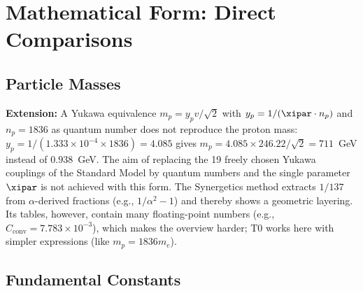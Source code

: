 	\section{Mathematical Form: Direct Comparisons}
	
	\subsection{Particle Masses}
	
	\begin{center}
	\end{center}
	
	
	
	\textbf{Extension:} A Yukawa equivalence $m_p = y_p v / \sqrt{2}$ with $y_p = 1 / (\xipar \cdot n_p)$ and $n_p = 1836$ as quantum number does not reproduce the proton mass: $y_p = 1/(1.333\times10^{-4}\times1836) = 4.085$ gives $m_p = 4.085\times246.22/\sqrt2 = 711$~GeV instead of $0.938$~GeV. The aim of replacing the 19 freely chosen Yukawa couplings of the Standard Model by quantum numbers and the single parameter $\xipar$ is not achieved with this form. The Synergetics method extracts $1/137$ from $\alpha$-derived fractions (e.g., $1/\alpha^2 - 1$) and thereby shows a geometric layering. Its tables, however, contain many floating-point numbers (e.g., $C_{\text{conv}} = 7.783 \times 10^{-3}$), which makes the overview harder; T0 works here with simpler expressions (like $m_p = 1836 m_e$).
	
	\subsection{Fundamental Constants}
	
